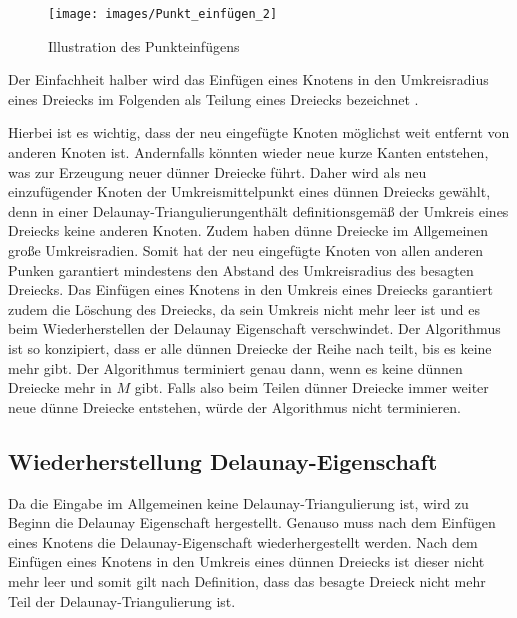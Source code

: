  \begin{figure}[h]
    \centering
    \texttt{[image: images/Punkt\_einfügen\_2]}
    \caption{Illustration des Punkteinfügens\cite{Sharp:2019:NIT} }%
    \label{fig:Punkt_einfügen}
\end{figure}
 
 
Der Einfachheit halber wird das Einfügen eines Knotens in den Umkreisradius eines Dreiecks im Folgenden als Teilung eines Dreiecks  bezeichnet \cite[zitiert nach \cite{shewchuk:1997:delaunay}]{Frey:1987:Umkreismittelpunkt}.
 

Hierbei ist es wichtig, dass der neu eingefügte Knoten möglichst weit entfernt von anderen Knoten ist. Andernfalls könnten wieder neue kurze Kanten entstehen, was zur Erzeugung neuer dünner Dreiecke führt. 
Daher wird als neu einzufügender Knoten der Umkreismittelpunkt eines dünnen Dreiecks \cite{ruppert:1995:delaunay, Frey:1987:Umkreismittelpunkt} gewählt, denn in einer Delaunay-Triangulierungenthält definitionsgemäß der Umkreis eines Dreiecks keine anderen Knoten. Zudem haben dünne Dreiecke im Allgemeinen große Umkreisradien. Somit hat der neu eingefügte Knoten von allen anderen Punken garantiert mindestens den Abstand des Umkreisradius des besagten Dreiecks. Das Einfügen eines Knotens in den Umkreis eines Dreiecks garantiert zudem die Löschung des Dreiecks, da sein Umkreis nicht mehr leer ist und es beim Wiederherstellen der Delaunay Eigenschaft verschwindet. 
Der Algorithmus ist so konzipiert, dass er alle dünnen Dreiecke der Reihe nach teilt, bis es keine mehr gibt. Der Algorithmus terminiert genau dann, wenn es keine dünnen Dreiecke mehr in $M$ gibt. Falls also beim Teilen dünner Dreiecke immer weiter neue dünne Dreiecke entstehen, würde der Algorithmus nicht terminieren.


 

\subsection*{Wiederherstellung Delaunay-Eigenschaft}
Da die Eingabe im Allgemeinen keine Delaunay-Triangulierung ist, wird zu Beginn die Delaunay Eigenschaft hergestellt.
Genauso muss nach dem Einfügen eines Knotens die Delaunay-Eigenschaft wiederhergestellt werden. Nach dem Einfügen eines Knotens in den Umkreis eines dünnen Dreiecks ist dieser nicht mehr leer und somit gilt nach Definition, dass das besagte Dreieck nicht mehr Teil der Delaunay-Triangulierung ist. \\

